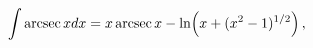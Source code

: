 \[\int\mathop{\mathrm{arcsec}\/}\nolimits xdx=x\mathop{\mathrm{arcsec}\/}%
\nolimits x-\mathop{\ln\/}\nolimits\!\left(x+(x^{2}-1)^{1/2}\right),\]